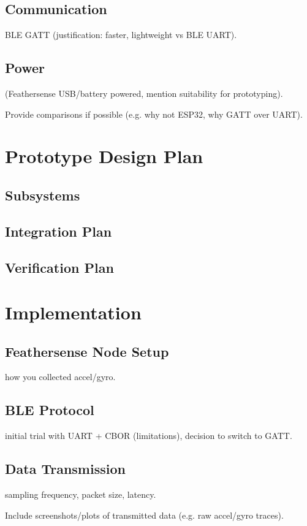\documentclass[conference]{lib/IEEEtran}
\begin{document}
\subsection{Communication}\label{COM}
BLE GATT (justification: faster, lightweight vs BLE UART).

\subsection{Power}
(Feathersense USB/battery powered, mention suitability for prototyping).

Provide comparisons if possible (e.g. why not ESP32, why GATT over UART).


\section{Prototype Design Plan}

\subsection{Subsystems}

\subsection{Integration Plan}

\subsection{Verification Plan}

\section{Implementation}
\subsection{Feathersense Node Setup}
how you collected accel/gyro.
\subsection{BLE Protocol}
initial trial with UART + CBOR (limitations), decision to switch to GATT.
\subsection{Data Transmission}
sampling frequency, packet size, latency.

Include screenshots/plots of transmitted data (e.g. raw accel/gyro traces).
\end{document}
